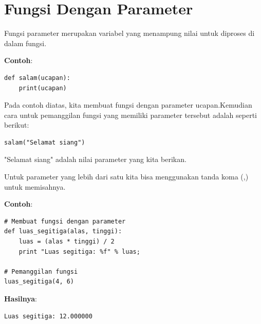 \section{Fungsi Dengan Parameter}
\par Fungsi parameter merupakan variabel yang menampung nilai untuk diproses di dalam fungsi.
\par \textbf{Contoh}:
\begin{lstlisting}
def salam(ucapan):
    print(ucapan)
\end{lstlisting}
Pada contoh diatas, kita membuat fungsi dengan parameter ucapan.Kemudian cara untuk pemanggilan fungsi yang memiliki parameter tersebut adalah seperti berikut:
\begin{lstlisting}
salam("Selamat siang")
\end{lstlisting}
"Selamat siang" adalah nilai parameter yang kita berikan.
\par Untuk parameter yang lebih dari satu kita bisa menggunakan tanda koma (,) untuk memisahnya.
\par\textbf{Contoh}:
\begin{lstlisting}
# Membuat fungsi dengan parameter
def luas_segitiga(alas, tinggi):
    luas = (alas * tinggi) / 2
    print "Luas segitiga: %f" % luas;

# Pemanggilan fungsi
luas_segitiga(4, 6)
\end{lstlisting}
\par\textbf{Hasilnya}:
\begin{lstlisting}
Luas segitiga: 12.000000
\end{lstlisting}
